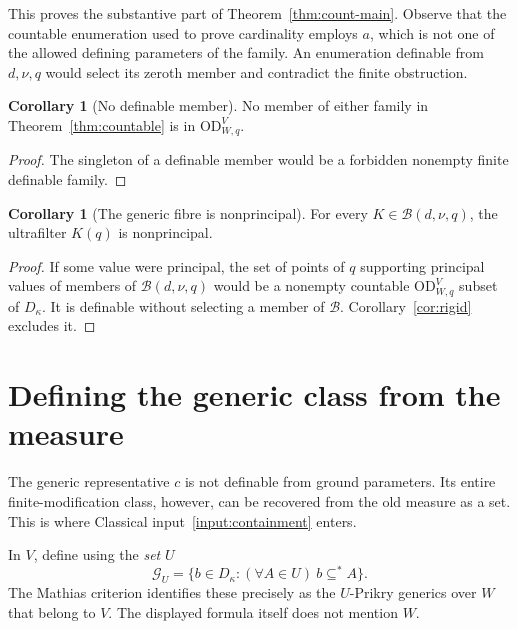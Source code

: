 \documentclass[11pt,letterpaper]{article}
\theoremstyle{definition}
\newtheorem{corollary}[definition]{Corollary}
\numberwithin{equation}{section}
\newcommand{\OD}{\mathrm{OD}}
\newcommand{\ODW}{\OD^{V}_{W,q}}
\begin{document}
This proves the substantive part of Theorem~\ref{thm:count-main}. Observe that the countable enumeration used to prove cardinality employs $a$, which is not one of the allowed defining parameters of the family. An enumeration definable from $d,\nu,q$ would select its zeroth member and contradict the finite obstruction.

\begin{corollary}[No definable member]\label{cor:no-member}
No member of either family in Theorem~\ref{thm:countable} is in $\ODW$.
\end{corollary}
\begin{proof}
The singleton of a definable member would be a forbidden nonempty finite definable family.
\end{proof}

\begin{corollary}[The generic fibre is nonprincipal]\label{cor:nonprincipal}
For every $K\in\mathcal B(d,\nu,q)$, the ultrafilter $K(q)$ is nonprincipal.
\end{corollary}
\begin{proof}
If some value were principal, the set of points of $q$ supporting principal values of members of $\mathcal B(d,\nu,q)$ would be a nonempty countable $\ODW$ subset of $D_\kappa$. It is definable without selecting a member of $\mathcal B$. Corollary~\ref{cor:rigid} excludes it.
\end{proof}

\section{Defining the generic class from the measure}\label{sec:qdef}

The generic representative $c$ is not definable from ground parameters. Its entire finite-modification class, however, can be recovered from the old measure as a set. This is where Classical input~\ref{input:containment} enters.

In $V$, define using the \emph{set} $U$
\[
\mathcal G_U=
\{b\in D_\kappa:(\forall A\in U)\ b\subseteq^*A\}.
\]
The Mathias criterion identifies these precisely as the $U$-Prikry generics over $W$ that belong to $V$. The displayed formula itself does not mention $W$.
\end{document}
